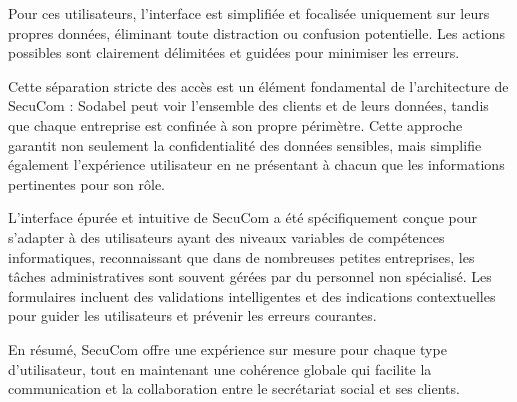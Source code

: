 Pour ces utilisateurs, l'interface est simplifiée et focalisée uniquement sur leurs propres données, éliminant toute distraction ou confusion potentielle. Les actions possibles sont clairement délimitées et guidées pour minimiser les erreurs.

Cette séparation stricte des accès est un élément fondamental de l'architecture de SecuCom : Sodabel peut voir l'ensemble des clients et de leurs données, tandis que chaque entreprise est confinée à son propre périmètre. Cette approche garantit non seulement la confidentialité des données sensibles, mais simplifie également l'expérience utilisateur en ne présentant à chacun que les informations pertinentes pour son rôle.

L'interface épurée et intuitive de SecuCom a été spécifiquement conçue pour s'adapter à des utilisateurs ayant des niveaux variables de compétences informatiques, reconnaissant que dans de nombreuses petites entreprises, les tâches administratives sont souvent gérées par du personnel non spécialisé. Les formulaires incluent des validations intelligentes et des indications contextuelles pour guider les utilisateurs et prévenir les erreurs courantes.

En résumé, SecuCom offre une expérience sur mesure pour chaque type d'utilisateur, tout en maintenant une cohérence globale qui facilite la communication et la collaboration entre le secrétariat social et ses clients.
